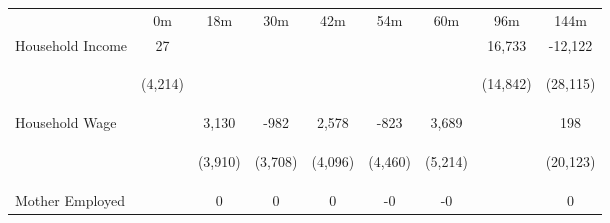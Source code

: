 \begin{tabular}{lcccccccc}
\hline \noalign{\smallskip} & 0m & 18m & 30m & 42m & 54m & 60m & 96m & 144m\\
\noalign{\smallskip}\hline \noalign{\smallskip}Household Income & 27 &  &  &  &  &  & 16,733 & -12,122\\
 & \begin{footnotesize}(4,214)\end{footnotesize} & \begin{footnotesize}\end{footnotesize} & \begin{footnotesize}\end{footnotesize} & \begin{footnotesize}\end{footnotesize} & \begin{footnotesize}\end{footnotesize} & \begin{footnotesize}\end{footnotesize} & \begin{footnotesize}(14,842)\end{footnotesize} & \begin{footnotesize}(28,115)\end{footnotesize}\\
\noalign{\smallskip}Household Wage &  & 3,130 & -982 & 2,578 & -823 & 3,689 &  & 198\\
 & \begin{footnotesize}\end{footnotesize} & \begin{footnotesize}(3,910)\end{footnotesize} & \begin{footnotesize}(3,708)\end{footnotesize} & \begin{footnotesize}(4,096)\end{footnotesize} & \begin{footnotesize}(4,460)\end{footnotesize} & \begin{footnotesize}(5,214)\end{footnotesize} & \begin{footnotesize}\end{footnotesize} & \begin{footnotesize}(20,123)\end{footnotesize}\\
\noalign{\smallskip}Mother Employed &  & 0 & 0 & 0 & -0 & -0 &  & 0\\

\end{tabular}
